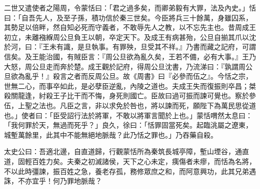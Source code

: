 \begin{pinyinscope}
二世又遣使者之陽周，令蒙恬曰：「君之過多矣，而卿弟毅有大罪，法及內史。」恬曰：「自吾先人，及至子孫，積功信於秦三世矣。今臣將兵三十餘萬，身雖囚系，其勢足以倍畔，然自知必死而守義者，不敢辱先人之教，以不忘先主也。昔周成王初立，未離襁緥周公旦負王以朝，卒定天下。及成王有病甚殆，公旦自揃其爪以沈於河，曰：『王未有識，是旦執事。有罪殃，旦受其不祥。』乃書而藏之記府，可謂信矣。及王能治國，有賊臣言：『周公旦欲為亂久矣，王若不備，必有大事。』王乃大怒，周公旦走而奔於楚。成王觀於記府，得周公旦沈書，乃流涕曰：『孰謂周公旦欲為亂乎！』殺言之者而反周公旦。故《周書》曰『必參而伍之』。今恬之宗，世無二心，而事卒如此，是必孽臣逆亂，內陵之道也。夫成王失而復振則卒昌；桀殺關龍逢，紂殺王子比干而不悔，身死則國亡。臣故曰過可振而諫可覺也。察於參伍，上聖之法也。凡臣之言，非以求免於咎也，將以諫而死，願陛下為萬民思從道也。」使者曰：「臣受詔行法於將軍，不敢以將軍言聞於上也。」蒙恬喟然太息曰：「我何罪於天，無過而死乎？」良久，徐曰：「恬罪固當死矣。起臨洮屬之遼東，城塹萬餘里，此其中不能無絕地脈哉？此乃恬之罪也。」乃吞藥自殺。

太史公曰：吾適北邊，自直道歸，行觀蒙恬所為秦筑長城亭障，塹山堙谷，通直道，固輕百姓力矣。夫秦之初滅諸侯，天下之心未定，痍傷者未瘳，而恬為名將，不以此時彊諫，振百姓之急，養老存孤，務修眾庶之和，而阿意興功，此其兄弟遇誅，不亦宜乎！何乃罪地脈哉？


\end{pinyinscope}